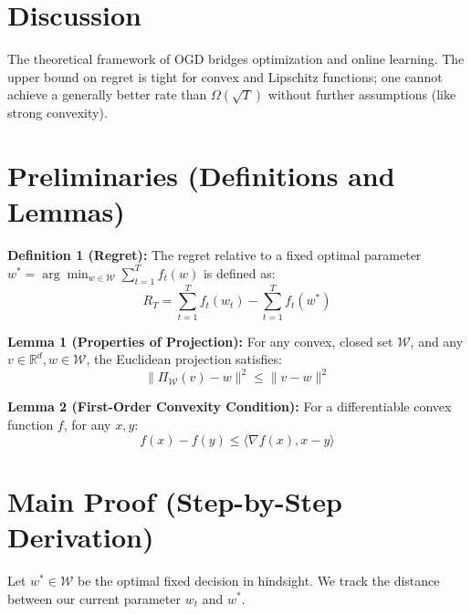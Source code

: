 \documentclass[11pt]{article}
\begin{document}
\section*{Discussion}
The theoretical framework of OGD bridges optimization and online learning. The upper bound on regret is tight for convex and Lipschitz functions; one cannot achieve a generally better rate than $\Omega(\sqrt{T})$ without further assumptions (like strong convexity).

\section*{Preliminaries (Definitions and Lemmas)}
\textbf{Definition 1 (Regret):} The regret relative to a fixed optimal parameter $w^* = \arg\min_{w \in \mathcal{W}} \sum_{t=1}^T f_t(w)$ is defined as:
$$R_T = \sum_{t=1}^T f_t(w_t) - \sum_{t=1}^T f_t(w^*)$$

\textbf{Lemma 1 (Properties of Projection):} For any convex, closed set $\mathcal{W}$, and any $v \in \mathbb{R}^d, w \in \mathcal{W}$, the Euclidean projection satisfies:
$$\|\Pi_{\mathcal{W}}(v) - w\|^2 \le \|v - w\|^2$$

\textbf{Lemma 2 (First-Order Convexity Condition):} For a differentiable convex function $f$, for any $x, y$:
$$f(x) - f(y) \le \langle \nabla f(x), x - y \rangle$$

\section*{Main Proof (Step-by-Step Derivation)}
Let $w^* \in \mathcal{W}$ be the optimal fixed decision in hindsight. We track the distance between our current parameter $w_t$ and $w^*$.
\end{document}
